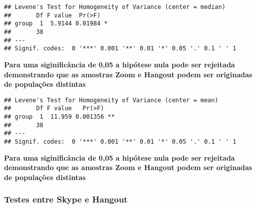 \documentclass[
]{article}
\newenvironment{Shaded}{\begin{snugshade}}{\end{snugshade}}
\newcommand{\DataTypeTok}[1]{\textcolor[rgb]{0.13,0.29,0.53}{#1}}
\newcommand{\KeywordTok}[1]{\textcolor[rgb]{0.13,0.29,0.53}{\textbf{#1}}}
\newcommand{\NormalTok}[1]{#1}
\newcommand{\OperatorTok}[1]{\textcolor[rgb]{0.81,0.36,0.00}{\textbf{#1}}}
\newcommand{\StringTok}[1]{\textcolor[rgb]{0.31,0.60,0.02}{#1}}
\begin{document}
\begin{verbatim}
## Levene's Test for Homogeneity of Variance (center = median)
##       Df F value  Pr(>F)  
## group  1  5.9144 0.01984 *
##       38                  
## ---
## Signif. codes:  0 '***' 0.001 '**' 0.01 '*' 0.05 '.' 0.1 ' ' 1
\end{verbatim}

\textbf{Para uma siginificância de 0,05 a hipótese nula pode ser
rejeitada demonstrando que as amostras Zoom e Hangout podem ser
originadas de populações distintas}

\begin{Shaded}
\end{Shaded}

\begin{verbatim}
## Levene's Test for Homogeneity of Variance (center = mean)
##       Df F value   Pr(>F)   
## group  1  11.959 0.001356 **
##       38                    
## ---
## Signif. codes:  0 '***' 0.001 '**' 0.01 '*' 0.05 '.' 0.1 ' ' 1
\end{verbatim}

\textbf{Para uma siginificância de 0,05 a hipótese nula pode ser
rejeitada demonstrando que as amostras Zoom e Hangout podem ser
originadas de populações distintas}

\hypertarget{testes-entre-skype-e-hangout}{%
\subsubsection{Testes entre Skype e
Hangout}\label{testes-entre-skype-e-hangout}}

\begin{Shaded}
\end{Shaded}
\end{document}
